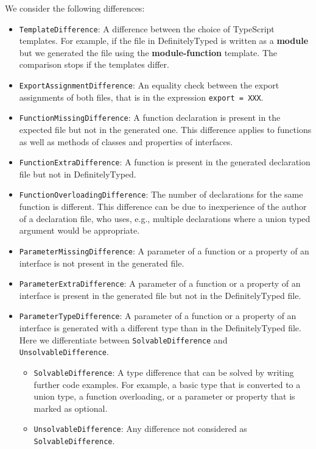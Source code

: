 \documentclass[sigconf]{acmart}
\begin{document}
We consider the following differences:
\begin{itemize}
  \item \texttt{TemplateDifference}: A difference between the choice of TypeScript
    templates. For example, if the file in DefinitelyTyped is written as a \textbf{module}
    but we generated the file using the \textbf{module-function} template. The comparison
    stops if the templates differ. 
  \item \texttt{ExportAssignmentDifference}: An equality check between the export
    assignments of both files, that is in the expression
    \lstinline{export = XXX}.
  \item \texttt{FunctionMissingDifference}: A function declaration is present in the expected
    file but not in the generated one. This difference applies to functions as well as methods of classes
    and properties of interfaces. 
  \item \texttt{FunctionExtraDifference}: A function is present in the generated declaration file but not in DefinitelyTyped.
  \item \texttt{FunctionOverloadingDifference}: The number of declarations for the same
    function is different. This difference can be due to inexperience of the author of a
    declaration file, who uses, e.g., multiple declarations where a union typed argument
    would be appropriate.
  \item \texttt{ParameterMissingDifference}: A parameter of a function or a property of an interface is not present in the generated file.
  \item \texttt{ParameterExtraDifference}: A parameter of a function or a property of an
    interface is present in the generated file but not in the DefinitelyTyped file. 
  \item \texttt{ParameterTypeDifference}: A parameter of a function or a property of an interface is generated with a different type than in the DefinitelyTyped file. Here we differentiate between \texttt{SolvableDifference} and \texttt{UnsolvableDifference}.
  \begin{itemize}
    \item \texttt{SolvableDifference}: A type difference that can be solved by writing
      further code examples. For example, a basic type that is converted to a union type,
      a function overloading, or a parameter or property that is marked as optional. 
    \item \texttt{UnsolvableDifference}: Any difference not considered as \texttt{SolvableDifference}.
  \end{itemize}
\end{itemize}
\end{document}
